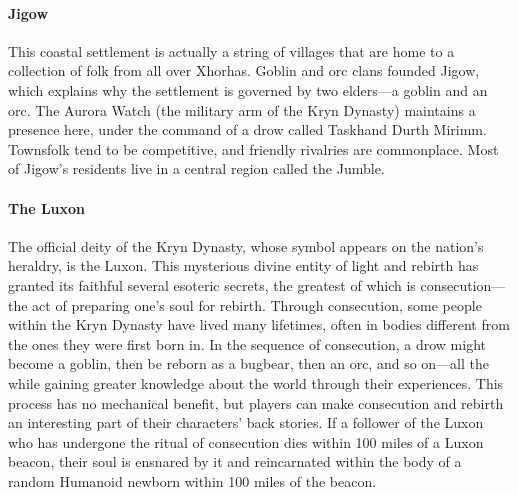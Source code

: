 \documentclass[10pt,a4,twoside,twocolumn,openany,nodeprecatedcode]{dndbook}
\begin{document}
\paragraph{Jigow}
This coastal settlement is actually a string of villages that are home to a collection of folk from all over Xhorhas. Goblin and orc clans founded Jigow, which explains why the settlement is governed by two elders—a goblin and an orc. The Aurora Watch (the military arm of the Kryn Dynasty) maintains a presence here, under the command of a drow called Taskhand Durth Mirimm.
Townsfolk tend to be competitive, and friendly rivalries are commonplace. Most of Jigow's residents live in a central region called the Jumble.
\paragraph{The Luxon}
The official deity of the Kryn Dynasty, whose symbol appears on the nation's heraldry, is the Luxon. This mysterious divine entity of light and rebirth has granted its faithful several esoteric secrets, the greatest of which is consecution—the act of preparing one's soul for rebirth. Through consecution, some people within the Kryn Dynasty have lived many lifetimes, often in bodies different from the ones they were first born in. In the sequence of consecution, a drow might become a goblin, then be reborn as a bugbear, then an orc, and so on—all the while gaining greater knowledge about the world through their experiences. This process has no mechanical benefit, but players can make consecution and rebirth an interesting part of their characters' back stories.
If a follower of the Luxon who has undergone the ritual of consecution dies within 100 miles of a Luxon beacon, their soul is ensnared by it and reincarnated within the body of a random Humanoid newborn within 100 miles of the beacon.
\end{document}
